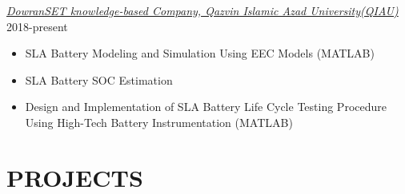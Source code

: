 \documentclass[10pt,a4paper,sans]{moderncv} %
\begin{document}
		\href{http://dowranset.com/}{ \emph{DowranSET knowledge-based Company, Qazvin Islamic Azad University(QIAU)}} \hfill 2018-present
		
		\begin{itemize}[nosep, leftmargin=0.9cm ]
    	    \item SLA Battery Modeling and Simulation Using EEC Models (MATLAB) %
    	    \item SLA Battery SOC Estimation 
    	    \item Design and Implementation of SLA Battery Life Cycle Testing Procedure Using High-Tech Battery Instrumentation (MATLAB)
		\end{itemize}
		
	\vspace{-1em}	
	
	\section{PROJECTS}
	
\end{document}
